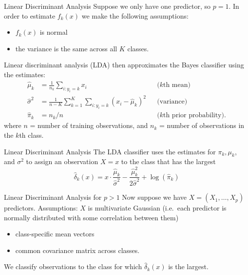 \documentclass[
  ignorenonframetext,
  aspectratio=169,
]{beamer}
\begin{document}
\begin{frame}{Linear Discriminant Analysis}
\protect\hypertarget{linear-discriminant-analysis}{}
Suppose we only have one predictor, so \(p = 1\). In order to estimate
\(f_k(x)\) we make the following assumptions:

\begin{itemize}
\item
  \(f_k(x)\) is normal
\item
  the variance is the same across all \(K\) classes.
\end{itemize}

Linear discriminant analysis (LDA) then approximates the Bayes
classifier using the estimates: \[
\begin{aligned}
\hat{\mu}_{k} &=\frac{1}{n_{k}} \sum_{i: y_{i}=k} x_{i} && (k \text{th mean)}\\
\hat{\sigma}^{2} &=\frac{1}{n-K} \sum_{k=1}^{K} \sum_{i: y_{i}=k}\left(x_{i}-\hat{\mu}_{k}\right)^{2} && \text{(variance)}\\
\hat{\pi}_{k}&=n_{k} / n && (k \text{th prior probability)}.
\end{aligned}
\] where \(n\) = number of training observations, and \(n_k\) = number
of observations in the \(k\)th class.
\end{frame}

\begin{frame}{Linear Discriminant Analysis}
\protect\hypertarget{linear-discriminant-analysis-1}{}
The LDA classifier uses the estimates for \(\pi_{k}, \mu_{k}\), and
\(\sigma^{2}\) to assign an observation \(X = x\) to the class that has
the largest \[
\hat{\delta}_{k}(x)=x \cdot \frac{\hat{\mu}_{k}}{\hat{\sigma}^{2}}-\frac{\hat{\mu}_{k}^{2}}{2 \hat{\sigma}^{2}}+\log \left(\hat{\pi}_{k}\right)\]
\end{frame}

\begin{frame}{Linear Discriminant Analysis for \(p>1\)}
\protect\hypertarget{linear-discriminant-analysis-for-p1}{}
Now suppose we have \(X = (X_1, \dots, X_p)\) predictors. Assumptions:
\(X\) is multivariate Gaussian (i.e.~each predictor is normally
distributed with some correlation between them)

\begin{itemize}
\item
  class-specific mean vectors
\item
  common covariance matrix across classes.
\end{itemize}

We classify observations to the class for which \(\hat{\delta}_{k}(x)\)
is the largest.
\end{frame}
\end{document}
